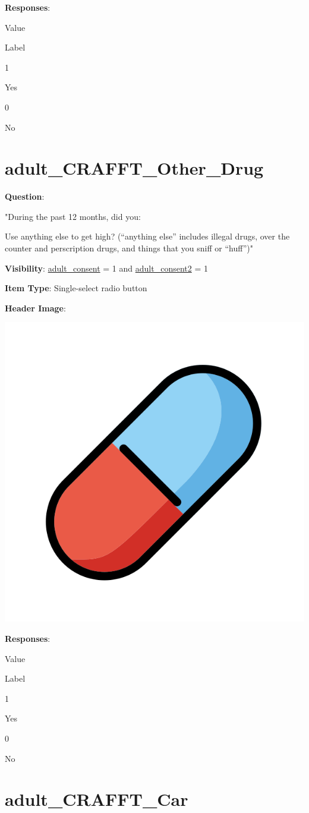 \documentclass[]{book}
\begin{document}
\textbf{Responses}:

Value

Label

1

Yes

0

No

\hypertarget{adult_crafft_other_drug}{%
\section{adult\_CRAFFT\_Other\_Drug}\label{adult_crafft_other_drug}}

\textbf{Question}:

"During the past 12 months, did you:

Use anything else to get high? (``anything else'' includes illegal drugs, over the counter and perscription drugs, and things that you sniff or ``huff'')"

\textbf{Visibility}: \protect\hyperlink{adult_consent}{adult\_consent} = 1 and \protect\hyperlink{adult_consent2}{adult\_consent2} = 1

\textbf{Item Type}: Single-select radio button

\textbf{Header Image}:

\begin{flushleft}\includegraphics[width=0.33\linewidth]{downloadFigs4latex_HBN_PMHS_Codebook/adult_CRAFFT_Other_Drug_headerImg} \end{flushleft}

\textbf{Responses}:

Value

Label

1

Yes

0

No

\hypertarget{adult_crafft_car}{%
\section{adult\_CRAFFT\_Car}\label{adult_crafft_car}}
\end{document}
